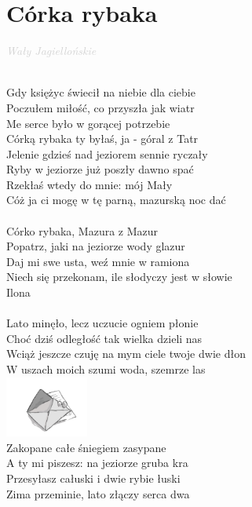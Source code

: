 \documentclass[a5paper, 10pt]{book}
\begin{document}
\section{Córka rybaka}\textcolor{lightgray}{\textit{Wały Jagiellońskie}}\\~\\
\begin{minipage}[t]{0.8\textwidth}
Gdy księżyc świecił na niebie dla ciebie\\
Poczułem miłość, co przyszła jak wiatr\\
Me serce było w gorącej potrzebie\\
Córką rybaka ty byłaś, ja - góral z Tatr\\
Jelenie gdzieś nad jeziorem sennie ryczały\\
Ryby w jeziorze już poszły dawno spać\\
Rzekłaś wtedy do mnie: mój Mały\\
Cóż ja ci mogę w tę parną, mazurską noc dać\\
\\
\hspace*{5mm}Córko rybaka, Mazura z Mazur\\
\hspace*{5mm}Popatrz, jaki na jeziorze wody glazur\\
\hspace*{5mm}Daj mi swe usta, weź mnie w ramiona\\
\hspace*{5mm}Niech się przekonam, ile słodyczy jest w słowie\\
\hspace*{5mm}Ilona\\
\\
Lato minęło, lecz uczucie ogniem płonie\\
Choć dziś odległość tak wielka dzieli nas\\
Wciąż jeszcze czuję na mym ciele twoje dwie dłon\\
W uszach moich szumi woda, szemrze las\\
\includegraphics[height=2cm,right]{images/corka_rybaka.png}\vspace*{-21mm}\\
Zakopane całe śniegiem zasypane\\
A ty mi piszesz: na jeziorze gruba kra\\
Przesyłasz całuski i dwie rybie łuski\\
Zima przeminie, lato złączy serca dwa\\
\end{minipage}
\end{document}
